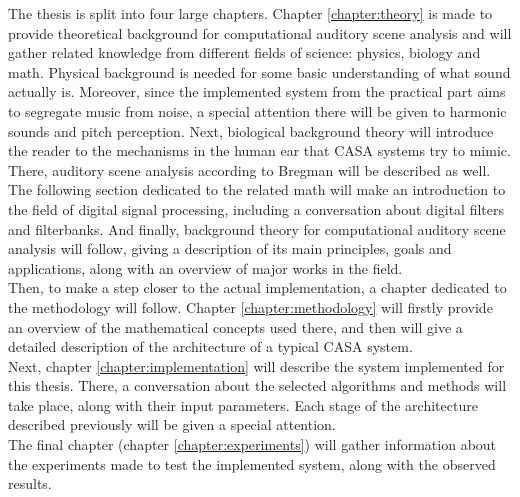 The thesis is split into four large chapters. Chapter \ref{chapter:theory} is made to provide theoretical background for computational auditory scene analysis and will gather related knowledge from different fields of science: physics, biology and math. Physical background is needed for some basic understanding of what sound actually is. Moreover, since the implemented system from the practical part aims to segregate music from noise, a special attention there will be given to harmonic sounds and pitch perception. Next, biological background theory will introduce the reader to the mechanisms in the human ear that CASA systems try to mimic. There, auditory scene analysis according to Bregman will be described as well. The following section dedicated to the related math will make an introduction to the field of digital signal processing, including a conversation about digital filters and filterbanks. And finally, background theory for computational auditory scene analysis will follow, giving a description of its main principles, goals and applications, along with an overview of major works in the field.\\

Then, to make a step closer to the actual implementation, a chapter dedicated to the metho\-dology will follow. Chapter \ref{chapter:methodology} will firstly provide an overview of the mathematical concepts used there, and then will give a detailed description of the architecture of a typical CASA system.\\

Next, chapter \ref{chapter:implementation} will describe the system implemented for this thesis. There, a conversation about the selected algorithms and methods will take place, along with their input parameters. Each stage of the architecture described previously will be given a special attention.\\

The final chapter (chapter \ref{chapter:experiments}) will gather information about the experiments made to test the implemented system, along with the observed results.\\
